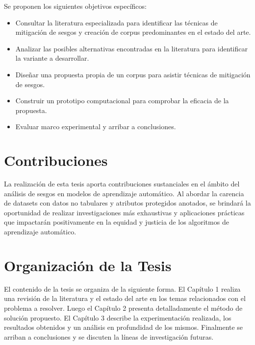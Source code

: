 Se proponen los siguientes objetivos espec\'ificos:
\begin{itemize}
    \item Consultar la literatura especializada para identificar las t\'ecnicas de mitigaci\'on de sesgos y creaci\'on
    de corpus predominantes en el estado del arte.
    \item Analizar las posibles alternativas encontradas en la literatura para identificar la variante a desarrollar.
    \item Dise\~nar una propuesta propia de un corpus para asistir t\'ecnicas de mitigaci\'on de sesgos. 
    \item Construir un prototipo computacional para comprobar la eficacia de la propuesta.
    \item Evaluar marco experimental y arribar a conclusiones.
\end{itemize}

\section*{Contribuciones}
La realizaci\'on de esta tesis aporta contribuciones sustanciales en el \'ambito del an\'alisis de sesgos en modelos de aprendizaje 
autom\'atico. Al abordar la carencia de datasets con datos no tabulares y atributos protegidos anotados, se brindar\'a la oportunidad
de realizar investigaciones m\'as exhaustivas y aplicaciones pr\'acticas que impactar\'an positivamente en la equidad y justicia de 
los algoritmos de aprendizaje autom\'atico.

\section*{Organizaci\'on de la Tesis}
El contenido de la tesis se organiza de la siguiente forma. El Cap\'itulo 1 realiza una revisi\'on de la literatura y el estado del arte 
en los temas relacionados con el problema a resolver. Luego el Cap\'itulo 2 presenta detalladamente el m\'etodo de soluci\'on propuesto. 
El Cap\'itulo 3 describe la experimentaci\'on realizada, los resultados obtenidos y un an\'alisis en profundidad de los mismos. 
Finalmente se arriban a conclusiones y se discuten la l\'ineas de investigaci\'on futuras.  